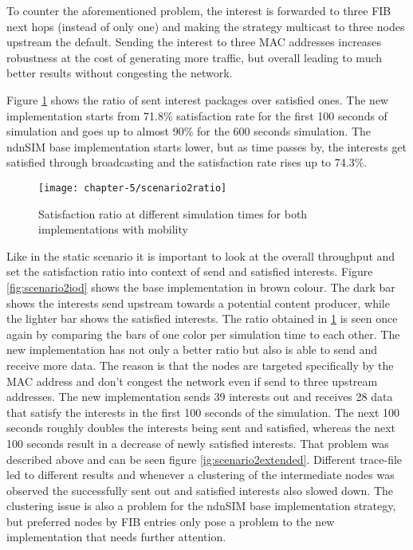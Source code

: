To counter the aforementioned problem, the interest is forwarded to three FIB next hops (instead of only one) and making the strategy multicast to three nodes upstream the default. Sending the interest to three MAC addresses increases robustness at the cost of generating more traffic, but overall leading to much better results without congesting the network.

Figure \ref{fig:scenario2ratio} shows the ratio of sent interest packages over satisfied ones. The new implementation starts from 71.8\% satisfaction rate for the first 100 seconds of simulation and goes up to almost 90\% for the 600 seconds simulation. The ndnSIM base implementation starts lower, but as time passes by, the interests get satisfied through broadcasting and the satisfaction rate rises up to 74.3\%.

\begin{figure}[H]
  \centering
  \texttt{[image: chapter-5/scenario2ratio]}
  \caption{Satisfaction ratio at different simulation times for both implementations with mobility}
  \label{fig:scenario2ratio}
\end{figure}

Like in the static scenario it is important to look at the overall throughput and set the satisfaction ratio into context of send and satisfied interests. Figure \ref{fig:scenario2iod} shows the base implementation in brown colour. The dark bar shows the interests send upstream towards a potential content producer, while the lighter bar shows the satisfied interests. The ratio obtained in \ref{fig:scenario2ratio} is seen once again by comparing the bars of one color per simulation time to each other. The new implementation has not only a better ratio but also is able to send and receive more data. The reason is that the nodes are targeted specifically by the MAC address and don't congest the network even if send to three upstream addresses.
The new implementation sends 39 interests out and receives 28 data that satisfy the interests in the first 100 seconds of the simulation. The next 100 seconds roughly doubles the interests being sent and satisfied, whereas the next 100 seconds result in a decrease of newly satisfied interests. That problem was described above and can be seen figure \ref{ig:scenario2extended}. Different trace-file led to different results and whenever a clustering of the intermediate nodes was observed the successfully sent out and satisfied interests also slowed down. The clustering issue is also a problem for the ndnSIM base implementation strategy, but preferred nodes by FIB entries only pose a problem to the new implementation that needs further attention.

